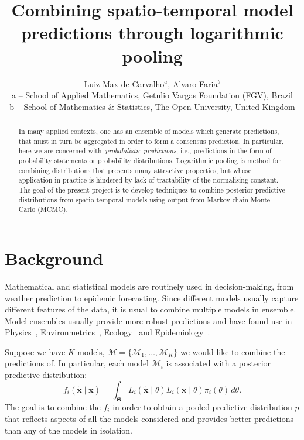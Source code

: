 \documentclass[a4paper, notitlepage, 11pt]{article}
\title{\vspace{-9ex}\centering \bf Combining spatio-temporal model predictions through logarithmic pooling}
\author{
Luiz Max de Carvalho$^{a}$, Alvaro Faria$^{b}$\\
a -- School of Applied Mathematics, Getulio Vargas Foundation (FGV), Brazil\\
b -- School of Mathematics \& Statistics, The Open University, United Kingdom\\
}
\begin{document}
\maketitle

\begin{abstract}
 In many applied contexts, one has an ensemble of models which generate predictions, that must in turn be aggregated in order to form a consensus prediction.
 In particular, here we are concerned with~\textit{probabilistic predictions}, i.e., predictions in the form of probability statements or probability distributions.
 Logarithmic pooling is method for combining distributions that presents many attractive properties, but whose application in practice is hindered by lack of tractability of the normalising constant.
 The goal of the present project is to develop techniques to combine posterior predictive distributions from spatio-temporal models using output from Markov chain Monte Carlo (MCMC). 
\end{abstract}


\section{Background}
\label{sec:intro}

Mathematical and statistical models are routinely used in decision-making, from weather prediction to epidemic forecasting.
Since different models usually capture different features of the data, it is usual to combine multiple models in ensemble.  
Model ensembles usually provide more robust predictions and have found use in Physics~\citep{Leutbecher2008}, Environmetrics~\citep{Roy2008}, Ecology~\citep{Araujo2007} and Epidemiology~\citep{Rosenfeld2012}.

Suppose we have $K$ models, $\boldsymbol{\mathcal{M}} = \{\mathcal{M}_1, \ldots, \mathcal{M}_K \}$ we would like to combine the predictions of.
In particular, each model $\mathcal{M}_i$ is associated with a posterior predictive distribution:
\begin{equation}
\label{eq:posterior_predictive}
 f_i(\tilde{\boldsymbol{x}} \mid \boldsymbol{x}) = \int_{\boldsymbol{\Theta}} L_i(\tilde{\boldsymbol{x}} \mid \theta)L_i(\boldsymbol{x} \mid \theta)\pi_i(\theta)\,d\theta.
\end{equation}
The goal is to combine the $f_i$ in order to obtain a pooled predictive distribution $p$ that reflects aspects of all the models considered and provides better predictions than any of the models in isolation.
\end{document}
